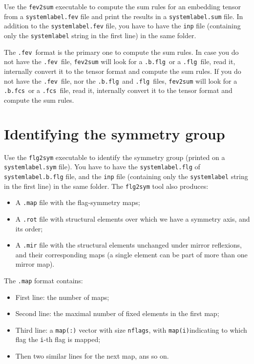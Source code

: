 \documentclass{scrreprt}
\newcommand{\fev}{\texttt{.fev}}
\newcommand{\fcs}{\texttt{.fcs}}
\newcommand{\flg}{\texttt{.flg}}
\newcommand{\fcsb}{\texttt{.b.fcs}}
\newcommand{\flgb}{\texttt{.b.flg}}
\begin{document}
Use the \verb-fev2sum- executable to compute the sum rules for an embedding tensor from a \verb-systemlabel.fev- file and print the results in a \verb-systemlabel.sum- file. In addition to the \verb-systemlabel.fev- file, you have to have the \verb-inp- file (containing only the \verb-systemlabel- string in the first line) in the same folder. 

The \fev~format is the primary one to compute the sum rules. In case you do not have the \fev~file, \verb-fev2sum- will look for a \flgb~or a \flg~file, read it, internally convert it to the tensor format and compute the sum rules. If you do not have the \fev~file, nor the \flgb~and \flg~files, \verb-fev2sum- will look for a \fcsb~or a \fcs~file, read it, internally convert it to the tensor format and compute the sum rules.

\section{Identifying the symmetry group}

Use the \verb-flg2sym- executable to identify the symmetry group (printed on a \verb-systemlabel.sym- file). You have to have the \verb-systemlabel.flg- of \verb-systemlabel.b.flg- file, and the \verb-inp- file (containing only the \verb-systemlabel- string in the first line) in the same folder. The \verb-flg2sym- tool also produces:
\begin{itemize}
 \item A \verb-.map- file with the flag-symmetry maps;
 \item A \verb-.rot- file with structural elements over which we have a symmetry axis, and its order;
 \item A \verb-.mir- file with the structural elements unchanged under mirror reflexions, and their corresponding maps (a single element can be part of more than one mirror map).
\end{itemize}

The \verb-.map- format contains:
\begin{itemize}
 \item First line: the number of maps;
 \item Second line: the maximal number of fixed elements in the first map;
 \item Third line: a \verb-map(:)- vector with size \verb-nflags-, with \verb-map(i)-indicating to which flag the \verb-i--th flag is mapped;
 \item Then two similar lines for the next map, ans so on.
\end{itemize}
\end{document}

